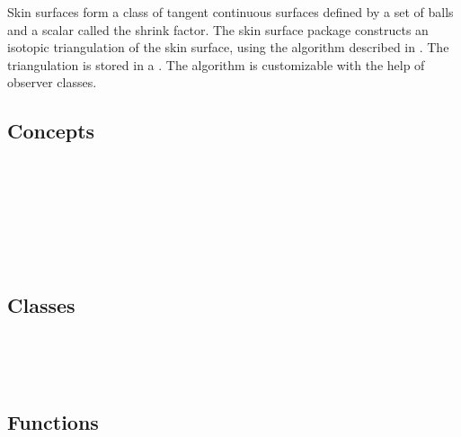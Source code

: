 
\label{chapterSkinSurfaceRef}

Skin surfaces form a class of tangent continuous surfaces defined by a
set of balls and a scalar called the shrink factor. The skin surface
package constructs an isotopic triangulation of the skin surface,
using the algorithm described in \cite{cgal:kv-mssct-05}. The
triangulation is stored in a . The algorithm
is customizable with the help of observer classes.

\subsection*{Concepts}
\\
\\
\\

\\
\\
\\


\subsection*{Classes}
\\

\\

\subsection*{Functions}
\\
\\



